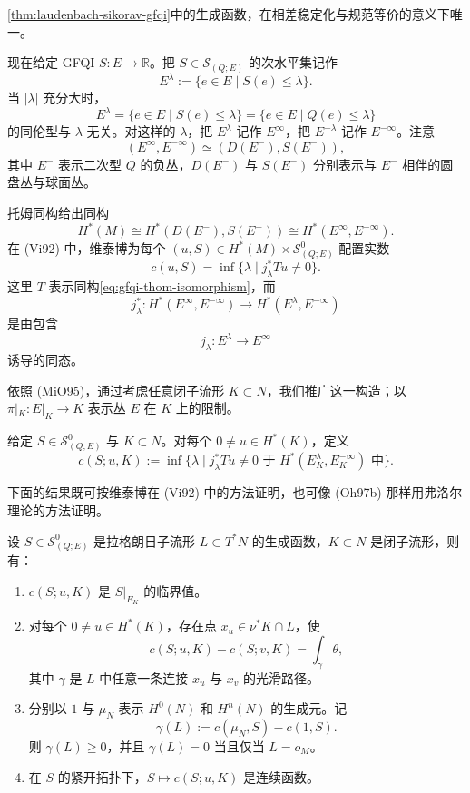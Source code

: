 \begin{theorem}[维泰博]\label{thm:viterbo-generating-function-uniqueness}
\cref{thm:laudenbach-sikorav-gfqi}中的生成函数，在相差稳定化与规范等价的意义下唯一。
\end{theorem}

现在给定 GFQI $S:E\to\mathbb R$。把
$S\in\mathcal S_{(Q;E)}$ 的次水平集记作
\[
 E^\lambda:=\{e\in E\mid S(e)\le\lambda\}.
\]
当 $|\lambda|$ 充分大时，
\[
 E^\lambda=\{e\in E\mid S(e)\le\lambda\}
 =\{e\in E\mid Q(e)\le\lambda\}
\]
的同伦型与 $\lambda$ 无关。对这样的 $\lambda$，把 $E^\lambda$ 记作
$E^\infty$，把 $E^{-\lambda}$ 记作 $E^{-\infty}$。注意
\[
 (E^\infty,E^{-\infty})\simeq(D(E^-),S(E^-)),
\]
其中 $E^-$ 表示二次型 $Q$ 的负丛，$D(E^-)$ 与 $S(E^-)$ 分别表示与
$E^-$ 相伴的圆盘丛与球面丛。

托姆同构给出同构
\begin{equation}
 H^*(M)\cong H^*(D(E^-),S(E^-))
 \cong H^*(E^\infty,E^{-\infty}).
 \label{eq:gfqi-thom-isomorphism}
\end{equation}
在 (Vi92) 中，维泰博为每个
$(u,S)\in H^*(M)\times\mathcal S^0_{(Q;E)}$ 配置实数
\[
 c(u,S)=\inf\{\lambda\mid j_\lambda^*Tu\ne0\}.
\]
这里 $T$ 表示同构\eqref{eq:gfqi-thom-isomorphism}，而
\[
 j_\lambda^*:H^*(E^\infty,E^{-\infty})
 \longrightarrow H^*(E^\lambda,E^{-\infty})
\]
是由包含
\[
 j_\lambda:E^\lambda\longrightarrow E^\infty
\]
诱导的同态。

依照 (MiO95)，通过考虑任意闭子流形 $K\subset N$，我们推广这一构造；以
$\pi|_K:E|_K\to K$ 表示丛 $E$ 在 $K$ 上的限制。

\begin{definition}\label{def:viterbo-minimax-invariant}
给定 $S\in\mathcal S^0_{(Q;E)}$ 与 $K\subset N$。对每个
$0\ne u\in H^*(K)$，定义
\[
 c(S;u,K):=\inf\{\lambda\mid
 j_\lambda^*Tu\ne0\text{ 于 }H^*(E_K^\lambda,E_K^{-\infty})\text{ 中}\}.
\]
\end{definition}

下面的结果既可按维泰博在 (Vi92) 中的方法证明，也可像 (Oh97b) 那样用弗洛尔理论的方法证明。

\begin{theorem}[参见 (Vi92) 的定理 2.3]\label{thm:viterbo-invariant-properties}
设 $S\in\mathcal S^0_{(Q;E)}$ 是拉格朗日子流形
$L\subset T^*N$ 的生成函数，$K\subset N$ 是闭子流形，则有：
\begin{enumerate}[label=(\arabic*)]
\item $c(S;u,K)$ 是 $S|_{E_K}$ 的临界值。
\item 对每个 $0\ne u\in H^*(K)$，存在点
$x_u\in\nu^*K\cap L$，使
\[
 c(S;u,K)-c(S;v,K)=\int_\gamma\theta,
\]
其中 $\gamma$ 是 $L$ 中任意一条连接 $x_u$ 与 $x_v$ 的光滑路径。
\item 分别以 $1$ 与 $\mu_N$ 表示 $H^0(N)$ 和 $H^n(N)$ 的生成元。记
\[
 \gamma(L):=c(\mu_N,S)-c(1,S).
\]
则 $\gamma(L)\ge0$，并且 $\gamma(L)=0$ 当且仅当 $L=o_M$。
\item 在 $S$ 的紧开拓扑下，$S\mapsto c(S;u,K)$ 是连续函数。
\end{enumerate}
\end{theorem}
